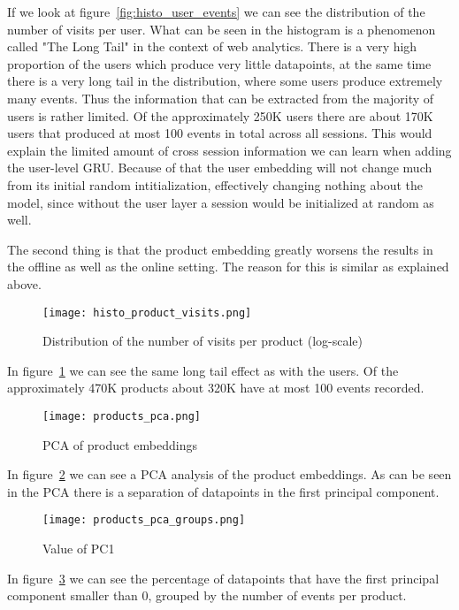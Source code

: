 If we look at figure~\ref{fig:histo_user_events} we can see the distribution of the number of visits per user.
What can be seen in the histogram is a phenomenon called "The Long Tail" in the context of web analytics.
There is a very high proportion of the users which produce very little datapoints, at the same time there is a very long tail in the distribution, where some users produce extremely many events.
Thus the information that can be extracted from the majority of users is rather limited.
Of the approximately 250K users there are about 170K users that produced at most 100 events in total across all sessions.
This would explain the limited amount of cross session information we can learn when adding the user-level GRU.
Because of that the user embedding will not change much from its initial random intitialization, effectively changing nothing about the model, since without the user layer a session would be initialized at random as well.
\par
The second thing is that the product embedding greatly worsens the results in the offline as well as the online setting.
The reason for this is similar as explained above.
\begin{figure}[ht]
	\centering
	\captionsetup{width=0.8\textwidth}
    \texttt{[image: histo\_product\_visits.png]}
    \caption{Distribution of the number of visits per product (log-scale)}
    \label{fig:histo_product_events}
\end{figure}
In figure~\ref{fig:histo_product_events} we can see the same long tail effect as with the users.
Of the approximately 470K products about 320K have at most 100 events recorded.
\begin{figure}[ht]
	\centering
	\captionsetup{width=0.8\textwidth}
    \texttt{[image: products\_pca.png]}
    \caption{PCA of product embeddings}
    \label{fig:products_pca}
\end{figure}
In figure~\ref{fig:products_pca} we can see a PCA analysis of the product embeddings.
As can be seen in the PCA there is a separation of datapoints in the first principal component.
\begin{figure}[ht]
	\centering
	\captionsetup{width=0.8\textwidth}
    \texttt{[image: products\_pca\_groups.png]}
    \caption{Value of PC1}
    \label{fig:products_pca_groups}
\end{figure}
In figure~\ref{fig:products_pca_groups} we can see the percentage of datapoints that have the first principal component smaller than 0, grouped by the number of events per product.
